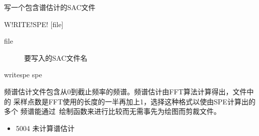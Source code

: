 \label{spe:writespe}

写一个包含谱估计的SAC文件

\begin{SACSTX}
W!RITE!SPE! [file]
\end{SACSTX}

\begin{description}
\item [file] 要写入的SAC文件名
\end{description}

\begin{SACDFT}
writespe spe
\end{SACDFT}

频谱估计文件包含从0到截止频率的频谱。频谱估计由FFT算法计算得出，文件中的
采样点数是FFT使用的长度的一半再加上1，选择这种格式以使由SPE计算出的多个
频谱能通过~绘制函数来进行比较而无需事先为绘图而剪裁文件。

\begin{itemize}
\item 5004 未计算谱估计
\end{itemize}
